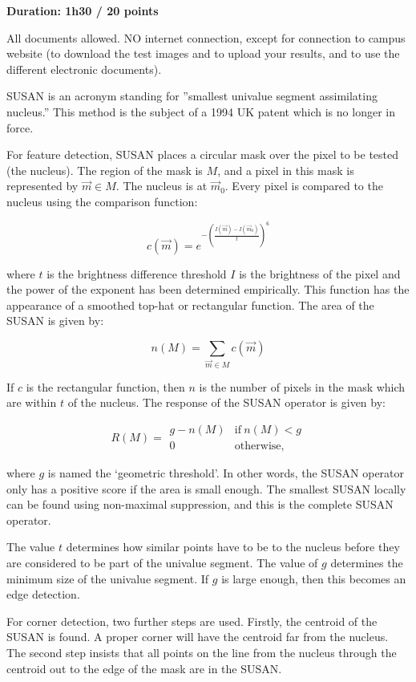 
\noindent
{\bf Duration: 1h30 / 20 points}

All documents allowed. NO internet connection, except for connection to campus website (to download the test images and to upload your results, and to use the different electronic documents).

\begin{wikipedia}
 
SUSAN is an acronym standing for ''smallest univalue segment assimilating nucleus.''  This method is the subject of a 1994 UK patent which is no longer in force.

For feature detection, SUSAN places a circular mask over the pixel to be tested (the nucleus). The region of the mask is $M$, and a pixel in this mask is represented by $\vec{m} \in M$. The nucleus is at $\vec{m}_0$. Every pixel is compared to the nucleus using the comparison function:

$$
c(\vec{m}) = e^{-\left(\frac{I(\vec{m}) - I(\vec{m}_0)}{t}\right)^6}
$$

where $t$ is the brightness difference threshold $I$ is the brightness of the pixel and the power of the exponent has been determined empirically. This function has the appearance of a smoothed top-hat or rectangular function. The area of the SUSAN is given by:

$$
n(M) = \sum_{\vec{m}\in M} c(\vec{m})
$$

If $c$ is the rectangular function, then $n$ is the number of pixels in the mask which are within $t$ of the nucleus. The response of the SUSAN operator is given by:

$$
R(M) =     \begin{array}{ll}
               g - n(M) & \mbox{if}\ n(M) < g\\
               0        & \mbox{otherwise,}
           \end{array}
$$

where $g$ is named the `geometric threshold'. In other words, the SUSAN operator only has a positive score if the area is small enough. The smallest SUSAN locally can be found using non-maximal suppression, and this is the complete SUSAN operator.

The value $t$ determines how similar points have to be to the nucleus before they are considered to be part of the univalue segment. The value of $g$ determines the minimum size of the univalue segment. If $g$ is large enough, then this becomes an edge detection.

For corner detection, two further steps are used. Firstly, the centroid of the SUSAN is found. A proper corner will have the centroid far from the nucleus. The second step insists that all points on the line from the nucleus through the centroid out to the edge of the mask are in the SUSAN.

\end{wikipedia}

